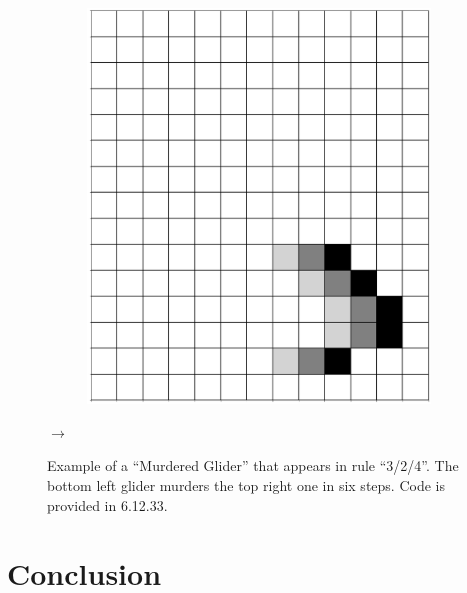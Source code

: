 \documentclass[12pt]{article}
\numberwithin{figure}{section} %
\begin{document}
\begin{figure}[H]
\begin{subfigure}{0.23\textwidth}
     	\subcaption{}
   	\end{subfigure}
	\begin{subfigure}{0.23\textwidth}
     	\includegraphics[width=\linewidth]{Section4/36.6}
     	\subcaption{}
   	\end{subfigure}
	{\LARGE$\rightarrow{}$}
   \caption{Example of a “Murdered Glider” that appears in rule “3/2/4”. The bottom left glider murders the top right one in six steps. Code is provided in 6.12.33.}
\end{figure}

\newpage
\section{Conclusion}
\end{document}

